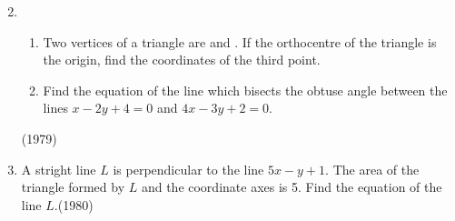\begin{enumerate}[label=\thesubsection.\arabic*.,ref=\thesubsection.\theenumi]
\begin{multicols}{4}
\begin{enumerate}
\end{enumerate}
\end{multicols}
\item                    	
	\begin{enumerate}
             \item  Two vertices of a triangle are  and . If the orthocentre of the triangle is the origin, find the coordinates of the third point.
	     \item  Find the equation of the line which bisects the obtuse angle between  the lines $x-2y+4=0$ and $4x-3y+2=0$.
         \end{enumerate}\hfill{(1979)}

\item A stright line $L$ is perpendicular to the line $5x-y+1$. The area of the triangle formed by $L$ and the coordinate axes is 5. Find the equation of the line $L$.\hfill{(1980)}


\end{enumerate}
